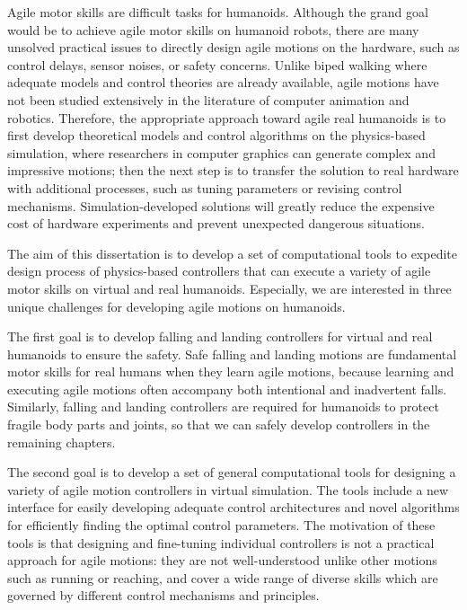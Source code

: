 Agile motor skills are difficult tasks for humanoids.
Although the grand goal would be to achieve agile motor skills on humanoid
robots, there are many unsolved practical issues to directly
design agile motions on the hardware,
such as control delays, sensor noises, or safety concerns.
Unlike biped walking where adequate models and control theories are
already available, agile motions have not been studied extensively in the
literature of computer animation and robotics.
Therefore, the appropriate approach toward agile real humanoids is to first
develop theoretical models and control algorithms on the physics-based
simulation, where researchers in computer graphics can
generate complex and impressive motions;
then the next step is to transfer the solution to real hardware
with additional processes, such as tuning parameters
or revising control mechanisms.
Simulation-developed solutions will
greatly reduce the expensive cost of hardware experiments and prevent
unexpected dangerous situations.

The aim of this dissertation is to develop a set of computational tools
  to expedite design process of physics-based controllers that can execute
  a variety of agile motor skills on virtual and real humanoids.
  Especially, we are interested in three unique challenges for developing agile
  motions on humanoids. 

The first goal is to develop falling and landing controllers for
  virtual and real humanoids to ensure the safety.
  Safe falling and landing motions are fundamental motor skills for real humans
  when they learn agile motions,
  because learning and executing agile motions often accompany both intentional
  and inadvertent falls.
  Similarly, falling and landing controllers are required for humanoids
  to protect fragile body parts and joints, so that we can safely develop
  controllers in the remaining chapters.

The second goal is to develop a set of general computational tools for
  designing a variety of agile motion controllers in virtual simulation.
  The tools include a new interface for easily developing adequate control
  architectures and novel algorithms for efficiently finding the optimal
  control parameters. 
  The motivation of these tools is that designing and fine-tuning individual
  controllers is not a practical approach for agile motions:  
  they are not well-understood unlike other motions such as running or
  reaching,  
  and cover a wide range of diverse skills which are governed by
  different control mechanisms and  principles.

